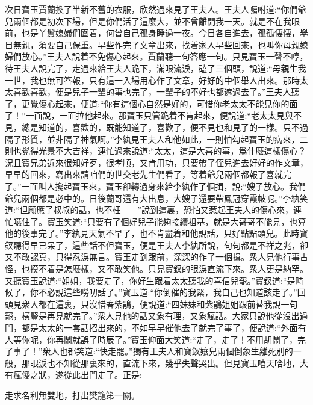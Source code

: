 \begin{parag}
    次日寶玉賈蘭換了半新不舊的衣服，欣然過來見了王夫人。王夫人囑咐道:“你們爺兒兩個都是初次下場，但是你們活了這麼大，並不曾離開我一天。就是不在我眼前，也是丫鬟媳婦們圍着，何曾自己孤身睡過一夜。今日各自進去，孤孤悽悽，舉目無親，須要自己保重。早些作完了文章出來，找着家人早些回來，也叫你母親媳婦們放心。”王夫人說着不免傷心起來。賈蘭聽一句答應一句。只見寶玉一聲不哼，待王夫人說完了，走過來給王夫人跪下，滿眼流淚，磕了三個頭，說道:“母親生我一世，我也無可答報，只有這一入場用心作了文章，好好的中個舉人出來。那時太太喜歡喜歡，便是兒子一輩的事也完了，一輩子的不好也都遮過去了。”王夫人聽了，更覺傷心起來，便道:“你有這個心自然是好的，可惜你老太太不能見你的面了！”一面說，一面拉他起來。那寶玉只管跪着不肯起來，便說道:“老太太見與不見，總是知道的，喜歡的，既能知道了，喜歡了，便不見也和見了的一樣。只不過隔了形質，並非隔了神氣啊。”李紈見王夫人和他如此，一則怕勾起寶玉的病來，二則也覺得光景不大吉祥，連忙過來說道:“太太，這是大喜的事，爲什麼這樣傷心？況且寶兄弟近來很知好歹，很孝順，又肯用功，只要帶了侄兒進去好好的作文章，早早的回來，寫出來請咱們的世交老先生們看了，等着爺兒兩個都報了喜就完了。”一面叫人攙起寶玉來。寶玉卻轉過身來給李紈作了個揖，說:“嫂子放心。我們爺兒兩個都是必中的。日後蘭哥還有大出息，大嫂子還要帶鳳冠穿霞帔呢。”李紈笑道:“但願應了叔叔的話，也不枉——”說到這裏，恐怕又惹起王夫人的傷心來，連忙嚥住了。寶玉笑道:“只要有了個好兒子能夠接續祖基，就是大哥哥不能見，也算他的後事完了。”李紈見天氣不早了，也不肯盡着和他說話，只好點點頭兒。此時寶釵聽得早已呆了，這些話不但寶玉，便是王夫人李紈所說，句句都是不祥之兆，卻又不敢認真，只得忍淚無言。寶玉走到跟前，深深的作了一個揖。衆人見他行事古怪，也摸不着是怎麼樣，又不敢笑他。只見寶釵的眼淚直流下來。衆人更是納罕。又聽寶玉說道:“姐姐，我要走了，你好生跟着太太聽我的喜信兒罷。”寶釵道:“是時候了，你不必說這些嘮叨話了。”寶玉道:“你倒催的我緊，我自己也知道該走了。”回頭見衆人都在這裏，只沒惜春紫鵑，便說道:“四妹妹和紫鵑姐姐跟前替我說一句罷，橫豎是再見就完了。”衆人見他的話又象有理，又象瘋話。大家只說他從沒出過門，都是太太的一套話招出來的，不如早早催他去了就完了事了，便說道:“外面有人等你呢，你再鬧就誤了時辰了。”寶玉仰面大笑道:“走了，走了！不用胡鬧了，完了事了！”衆人也都笑道:“快走罷。”獨有王夫人和寶釵孃兒兩個倒象生離死別的一般，那眼淚也不知從那裏來的，直流下來，幾乎失聲哭出。但見寶玉嘻天哈地，大有瘋傻之狀，遂從此出門走了。正是:
\end{parag}


\begin{poem}
    \begin{pl}
        走求名利無雙地，打出樊籠第一關。
    \end{pl}
\end{poem}


